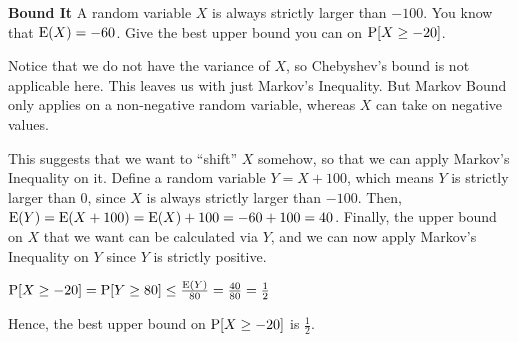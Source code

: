 \question \textbf{Bound It}\newline
A random variable $X$ is always strictly larger than $-100$. You know 
that $\E(X) = -60$. Give the best upper bound you can on $\P[X \geq -20]$.
\begin{solution}[3cm]
Notice that we do not have the variance of $X$, so Chebyshev's bound 
is not applicable here. 
This leaves us with just Markov's Inequality. But Markov Bound only applies on a non-negative random variable, whereas $X$ can take on negative values.

					
This suggests that we want to “shift” $X$ somehow, so that we can apply 
Markov’s Inequality on it. Define a random variable $Y = X + 100$, 
which means $Y$ is strictly larger than 0, since $X$ is always strictly 
larger than $-100$. Then, $\E(Y) = \E(X +100) = \E(X)+100 = -60+100 = 40$. 
Finally, the upper bound on $X$ that we want can be calculated via $Y$, 
and we can now apply Markov's Inequality on $Y$ since $Y$ is strictly 
positive.
					
$\P[X \geq -20] = \P[Y \geq 80] \leq \frac{\E(Y)}{80} = \frac{40}{80} = 
\frac{1}{2}$
					
Hence, the best upper bound on $\P[X \geq -20]$ is $\frac{1}{2}$. 
\end{solution}